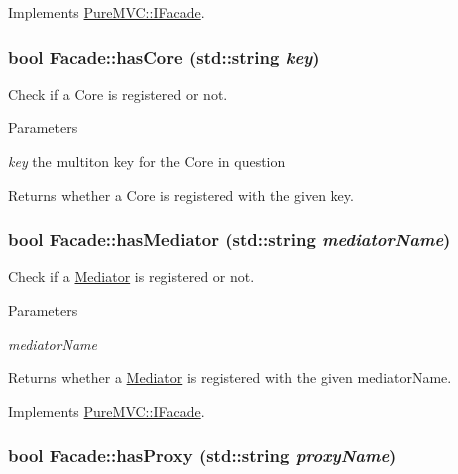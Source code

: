 Implements \hyperlink{class_pure_m_v_c_1_1_i_facade_abeb340386026eaa9218e8581cda6a12d}{PureMVC::IFacade}.\hypertarget{class_pure_m_v_c_1_1_facade_a9e8587984b47e2b252365a95dbaeffde}{
\subsubsection[{hasCore}]{\setlength{\rightskip}{0pt plus 5cm}bool Facade::hasCore (std::string {\em key})}}
\label{class_pure_m_v_c_1_1_facade_a9e8587984b47e2b252365a95dbaeffde}


Check if a Core is registered or not. 
\begin{DoxyParams}{Parameters}
\item[{\em key}]the multiton key for the Core in question \end{DoxyParams}
\begin{DoxyReturn}{Returns}
whether a Core is registered with the given {\ttfamily key}. 
\end{DoxyReturn}
\hypertarget{class_pure_m_v_c_1_1_facade_a214c067f65fabe53634541f531b41609}{
\subsubsection[{hasMediator}]{\setlength{\rightskip}{0pt plus 5cm}bool Facade::hasMediator (std::string {\em mediatorName})}}
\label{class_pure_m_v_c_1_1_facade_a214c067f65fabe53634541f531b41609}


Check if a \hyperlink{class_pure_m_v_c_1_1_mediator}{Mediator} is registered or not. 
\begin{DoxyParams}{Parameters}
\item[{\em mediatorName}]\end{DoxyParams}
\begin{DoxyReturn}{Returns}
whether a \hyperlink{class_pure_m_v_c_1_1_mediator}{Mediator} is registered with the given {\ttfamily mediatorName}. 
\end{DoxyReturn}


Implements \hyperlink{class_pure_m_v_c_1_1_i_facade_ab41b21fd725b18863d9ac8ada92984ce}{PureMVC::IFacade}.\hypertarget{class_pure_m_v_c_1_1_facade_aaeac78a5ffe3d7da658761287bdccb1e}{
\subsubsection[{hasProxy}]{\setlength{\rightskip}{0pt plus 5cm}bool Facade::hasProxy (std::string {\em proxyName})}}
\label{class_pure_m_v_c_1_1_facade_aaeac78a5ffe3d7da658761287bdccb1e}


